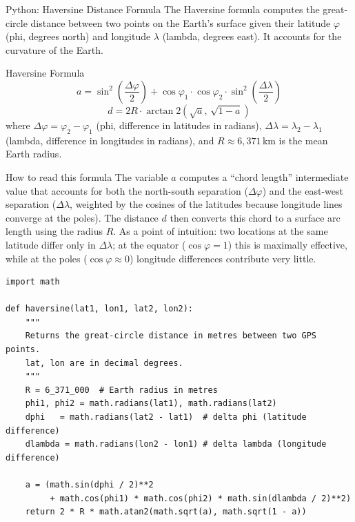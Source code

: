 \documentclass[aspectratio=169,10pt]{beamer}
\begin{document}
\begin{frame}[fragile]{Python: Haversine Distance Formula}
  The Haversine formula computes the great-circle distance between two
  points on the Earth's surface given their latitude $\varphi$ (phi,
  degrees north) and longitude $\lambda$ (lambda, degrees east).  It
  accounts for the curvature of the Earth.

  \begin{block}{Haversine Formula}
    \[
      a = \sin^2\!\!\left(\frac{\Delta\varphi}{2}\right)
          + \cos\varphi_1 \cdot \cos\varphi_2 \cdot
            \sin^2\!\!\left(\frac{\Delta\lambda}{2}\right)
    \]
    \[
      d = 2R \cdot \arctan2\!\left(\sqrt{a},\, \sqrt{1-a}\right)
    \]
    where $\Delta\varphi = \varphi_2 - \varphi_1$ (phi, difference in
    latitudes in radians), $\Delta\lambda = \lambda_2 - \lambda_1$
    (lambda, difference in longitudes in radians), and $R \approx
    6,\!371$\,km is the mean Earth radius.
  \end{block}

  \begin{alertblock}{How to read this formula}
    The variable $a$ computes a ``chord length'' intermediate value that
    accounts for both the north-south separation ($\Delta\varphi$) and
    the east-west separation ($\Delta\lambda$, weighted by the cosines of
    the latitudes because longitude lines converge at the poles).  The
    distance $d$ then converts this chord to a surface arc length using
    the radius $R$.  As a point of intuition: two locations at the same
    latitude differ only in $\Delta\lambda$; at the equator
    ($\cos\varphi = 1$) this is maximally effective, while at the poles
    ($\cos\varphi \approx 0$) longitude differences contribute very little.
  \end{alertblock}

\begin{lstlisting}[style=pythoncode]
import math

def haversine(lat1, lon1, lat2, lon2):
    """
    Returns the great-circle distance in metres between two GPS points.
    lat, lon are in decimal degrees.
    """
    R = 6_371_000  # Earth radius in metres
    phi1, phi2 = math.radians(lat1), math.radians(lat2)
    dphi   = math.radians(lat2 - lat1)  # delta phi (latitude difference)
    dlambda = math.radians(lon2 - lon1) # delta lambda (longitude difference)

    a = (math.sin(dphi / 2)**2
         + math.cos(phi1) * math.cos(phi2) * math.sin(dlambda / 2)**2)
    return 2 * R * math.atan2(math.sqrt(a), math.sqrt(1 - a))
\end{lstlisting}
\end{frame}
\end{document}
